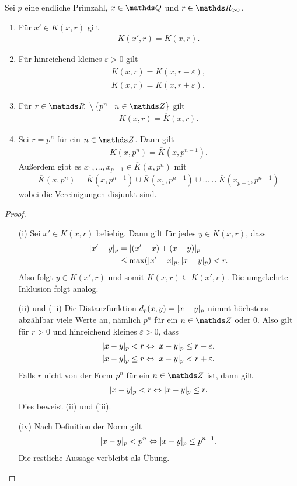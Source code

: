 \begin{satz}
Sei $p$ eine endliche Primzahl, $x\in \Q$ und $r\in \R_{>0}$.
\begin{enumerate}[label=(\roman*)]
\item Für $x'\in K(x,r)$ gilt
\begin{align*}
K(x',r)=K(x,r).
\end{align*}
\item Für hinreichend kleines $\varepsilon>0$ gilt
\begin{align*}
K(x,r)=\overline{K}(x,r-\varepsilon),\\
\overline{K}(x,r)=K(x,r+\varepsilon).
\end{align*}
\item Für $r\in \R\ \setminus \{p^n \mid n\in \Z\}$ gilt
\begin{align*}
K(x,r)=\overline{K}(x,r).
\end{align*}
\item Sei $r=p^n$ für ein $n\in \Z$. Dann gilt
\begin{align*}
K(x,p^n)=\overline{K}(x,p^{n-1}).
\end{align*}
Außerdem gibt es $x_1,\dots,x_{p-1}\in \overline{K}(x,p^n)$ mit
\begin{align*}
\overline{K}(x,p^n)=\overline{K}(x,p^{n-1})\cup \overline{K}(x_1,p^{n-1})\cup \dots \cup \overline{K}(x_{p-1},p^{n-1})
\end{align*}
wobei die Vereinigungen disjunkt sind.
\end{enumerate}
\begin{proof}
\begin{enumerate}
\item[(i)] Sei $x'\in K(x,r)$ beliebig.
Dann gilt für jedes $y\in K(x,r)$, dass 
\begin{align*}
|x'-y|_p&=|(x'-x)+(x-y)|_p\\
&\leq \max(|x'-x|_p,|x-y|_p)<r.
\end{align*}
Also folgt $y\in K(x',r)$ und somit $K(x,r)\subseteq K(x',r)$.
Die umgekehrte Inklusion folgt analog.
\item[(ii) und (iii)] Die Distanzfunktion $d_p(x,y)=|x-y|_p$ nimmt höchstens abzählbar viele Werte an, nämlich $p^n$ für ein $n\in \Z$ oder $0$.
Also gilt für $r>0$ und hinreichend kleines $\varepsilon>0$, dass
\begin{align*}
|x-y|_p<r \Leftrightarrow |x-y|_p \leq r-\varepsilon,\\
|x-y|_p \leq r \Leftrightarrow |x-y|_p<r+\varepsilon.
\end{align*}
Falls $r$ nicht von der Form $p^n$ für ein $n\in \Z$ ist, dann gilt
\begin{align*}
|x-y|_p<r \Leftrightarrow |x-y|_p\leq r.
\end{align*}
Dies beweist (ii) und (iii).
\item[(iv)] Nach Definition der Norm gilt
\begin{align*}
|x-y|_p<p^n \Leftrightarrow |x-y|_p\leq p^{n-1}.
\end{align*}
Die restliche Aussage verbleibt als Übung.
\qedhere
\end{enumerate}
\end{proof}
\end{satz}

